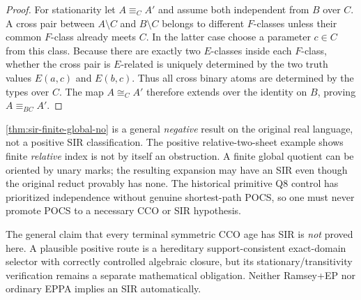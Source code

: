 \begin{proof}
For stationarity let
\(A\equiv_C A'\) and assume
both independent from \(B\) over \(C\).
A cross pair between \(A\setminus C\)
and \(B\setminus C\) belongs to
different \(F\)-classes unless
their common \(F\)-class already
meets \(C\). In the latter case
choose a parameter \(c\in C\)
from this class. Because there
are exactly two \(E\)-classes
inside each \(F\)-class, whether
the cross pair is \(E\)-related
is uniquely determined by the
two truth values \(E(a,c)\)
and \(E(b,c)\).
Thus all cross binary atoms are
determined by the types over
\(C\). The map \(A\cong_C A'\)
therefore extends over the
identity on \(B\), proving
\(A\equiv_{BC}A'\).
\end{proof}

\begin{remark}
\label{rem:sir-status}
\cref{thm:sir-finite-global-no}
is a general \emph{negative} result
on the original real language,
not a positive SIR classification.
The positive relative-two-sheet
example shows finite \emph{relative}
index is not by itself an obstruction.
A finite global quotient can be
oriented by unary marks; the
resulting expansion may have an SIR
even though the original reduct
provably has none.
The historical primitive Q8 control
has prioritized independence without
genuine shortest-path POCS, so one
must never promote POCS to a necessary
CCO or SIR hypothesis.

The general claim that every
terminal symmetric CCO age has SIR
is \emph{not} proved here.
A plausible positive route is a
hereditary support-consistent
exact-domain selector with correctly
controlled algebraic closure, but
its stationary/transitivity
verification remains a separate
mathematical obligation.
Neither Ramsey+EP nor ordinary
EPPA implies an SIR automatically.
\end{remark}
